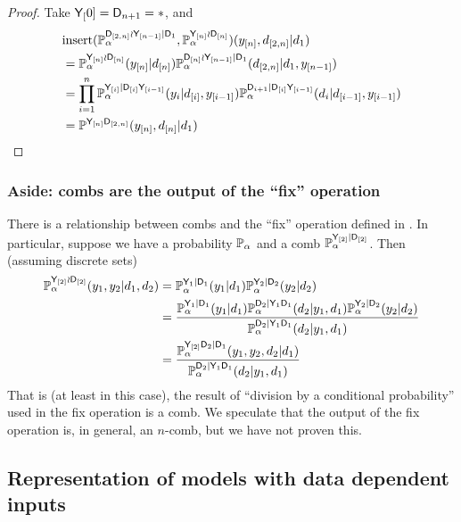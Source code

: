 \begin{proof}
Take $\mathsf{Y}_[0]=\mathsf{D}_{n+1}=*$, and
\begin{align}
    &\mathrm{insert}(\mathbb{P}_\alpha^{\mathsf{D}_{[2,n]}\wr \mathsf{Y}_{[n-1]}|\mathsf{D}_1},\mathbb{P}_\alpha^{\mathsf{Y}_{[n]}\wr \mathsf{D}_{[n]}})(y_{[n]},d_{[2,n]}|d_1)\\
     &= \mathbb{P}_\alpha^{\mathsf{Y}_{[n]}\wr \mathsf{D}_{[n]}}(y_{[n]}|d_{[n]})\mathbb{P}_\alpha^{\mathsf{D}_{[n]}\wr\mathsf{Y}_{[n-1]}|\mathsf{D}_1}(d_{[2,n]}|d_1,y_{[n-1]})\\
    &= \prod_{i=1}^n \mathbb{P}_\alpha^{\mathsf{Y}_{[i]}|\mathsf{D}_{[i]}\mathsf{Y}_{[i-1]}}(y_i|d_{[i]},y_{[i-1]})\mathbb{P}_\alpha^{\mathsf{D}_{i+1}|\mathsf{D}_{[i]}\mathsf{Y}_{[i-1]}}(d_i|d_{[i-1]},y_{[i-1]})\\
    &= \mathbb{P}^{\mathsf{Y}_{[n]}\mathsf{D}_{[2,n]}}(y_{[n]},d_{[n]}|d_1)
\end{align}
    
\end{proof}

\subsubsection{Aside: combs are the output of the ``fix'' operation}

There is a relationship between combs and the ``fix'' operation defined in \citet{richardson_nested_2017}. In particular, suppose we have a probability $\mathbb{P}_\alpha$ and a comb $\mathbb{P}_\alpha^{\mathsf{Y}_{[2]}|\mathsf{D}_{[2]}}$. Then (assuming discrete sets)
\begin{align}
    \mathbb{P}_\alpha^{\mathsf{Y}_{[2]}\wr \mathsf{D}_{[2]}}(y_1,y_2|d_1,d_2) &= \mathbb{P}_\alpha^{\mathsf{Y}_1|\mathsf{D}_1}(y_1|d_1)\mathbb{P}_\alpha^{\mathsf{Y}_2|\mathsf{D}_2}(y_2|d_2)\\
    &= \frac{\mathbb{P}_\alpha^{\mathsf{Y}_1|\mathsf{D}_1}(y_1|d_1)\mathbb{P}_\alpha^{\mathsf{D}_2|\mathsf{Y}_1\mathsf{D}_1}(d_2|y_1,d_1)\mathbb{P}_\alpha^{\mathsf{Y}_2|\mathsf{D}_2}(y_2|d_2)}{\mathbb{P}_\alpha^{\mathsf{D}_2|\mathsf{Y}_1\mathsf{D}_1}(d_2|y_1,d_1)}\\
    &= \frac{\mathbb{P}_\alpha^{\mathsf{Y}_{[2]}\mathsf{D}_2|\mathsf{D}_1}(y_1,y_2,d_2|d_1)}{\mathbb{P}_\alpha^{\mathsf{D}_2|\mathsf{Y}_1\mathsf{D}_1}(d_2|y_1,d_1)}
\end{align}
That is (at least in this case), the result of ``division by a conditional probability'' used in the fix operation is a comb. We speculate that the output of the fix operation is, in general, an $n$-comb, but we have not proven this.


\subsection[Representation of data-dependent inputs]{Representation of models with data dependent inputs}\label{sec:data_dependent_representation}

